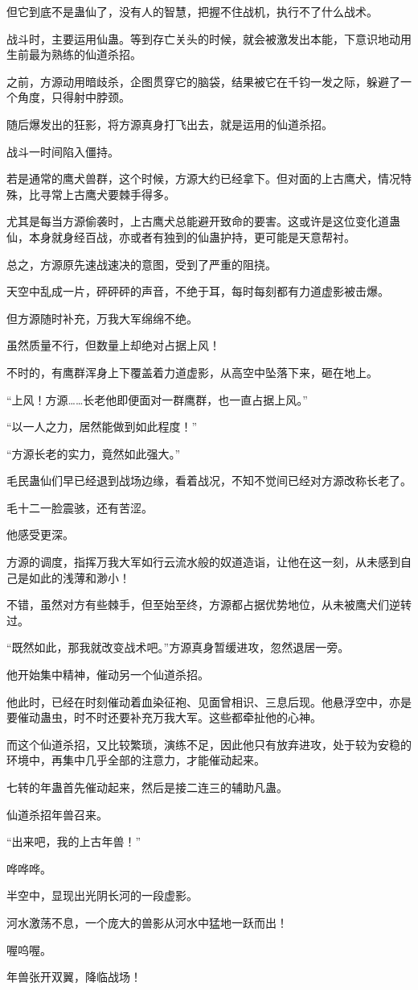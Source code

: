 \begin{this_body}
但它到底不是蛊仙了，没有人的智慧，把握不住战机，执行不了什么战术。

战斗时，主要运用仙蛊。等到存亡关头的时候，就会被激发出本能，下意识地动用生前最为熟练的仙道杀招。

之前，方源动用暗歧杀，企图贯穿它的脑袋，结果被它在千钧一发之际，躲避了一个角度，只得射中脖颈。

随后爆发出的狂影，将方源真身打飞出去，就是运用的仙道杀招。

战斗一时间陷入僵持。

若是通常的鹰犬兽群，这个时候，方源大约已经拿下。但对面的上古鹰犬，情况特殊，比寻常上古鹰犬要棘手得多。

尤其是每当方源偷袭时，上古鹰犬总能避开致命的要害。这或许是这位变化道蛊仙，本身就身经百战，亦或者有独到的仙蛊护持，更可能是天意帮衬。

总之，方源原先速战速决的意图，受到了严重的阻挠。

天空中乱成一片，砰砰砰的声音，不绝于耳，每时每刻都有力道虚影被击爆。

但方源随时补充，万我大军绵绵不绝。

虽然质量不行，但数量上却绝对占据上风！

不时的，有鹰群浑身上下覆盖着力道虚影，从高空中坠落下来，砸在地上。

“上风！方源……长老他即便面对一群鹰群，也一直占据上风。”

“以一人之力，居然能做到如此程度！”

“方源长老的实力，竟然如此强大。”

毛民蛊仙们早已经退到战场边缘，看着战况，不知不觉间已经对方源改称长老了。

毛十二一脸震骇，还有苦涩。

他感受更深。

方源的调度，指挥万我大军如行云流水般的奴道造诣，让他在这一刻，从未感到自己是如此的浅薄和渺小！

不错，虽然对方有些棘手，但至始至终，方源都占据优势地位，从未被鹰犬们逆转过。

“既然如此，那我就改变战术吧。”方源真身暂缓进攻，忽然退居一旁。

他开始集中精神，催动另一个仙道杀招。

他此时，已经在时刻催动着血染征袍、见面曾相识、三息后现。他悬浮空中，亦是要催动蛊虫，时不时还要补充万我大军。这些都牵扯他的心神。

而这个仙道杀招，又比较繁琐，演练不足，因此他只有放弃进攻，处于较为安稳的环境中，再集中几乎全部的注意力，才能催动起来。

七转的年蛊首先催动起来，然后是接二连三的辅助凡蛊。

仙道杀招年兽召来。

“出来吧，我的上古年兽！”

哗哗哗。

半空中，显现出光阴长河的一段虚影。

河水激荡不息，一个庞大的兽影从河水中猛地一跃而出！

喔呜喔。

年兽张开双翼，降临战场！

\end{this_body}

